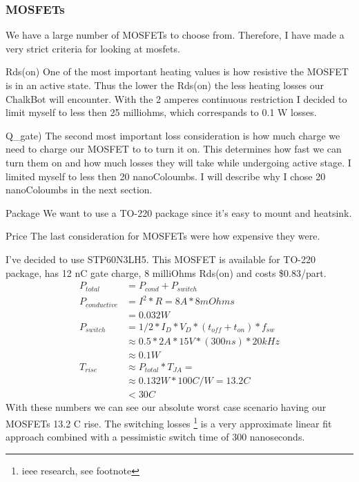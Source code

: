 \documentclass[12pt]{article}
\begin{document}
\subsubsection{MOSFETs}
We have a large number of MOSFETs to choose from. Therefore, I have made a very strict criteria for looking at mosfets.
\begin{description}
\item{Rds(on)} One of the most important heating values is how resistive the MOSFET is in an active state. Thus the lower the Rds(on) the less heating losses our ChalkBot will encounter. With the 2 amperes continuous restriction I decided to limit myself to less then 25 milliohms, which correspands to 0.1 W losses.
\item{Q\_gate)} The second most important loss consideration is how much charge we need to charge our MOSFET to to turn it on. This determines how fast we can turn them on and how much losses they will take while undergoing active stage. I limited myself to less then 20 nanoColoumbs. I will describe why I chose 20 nanoColoumbs in the next section.
\item{Package} We want to use a TO-220 package since it's easy to mount and heatsink. 
\item{Price} The last consideration for MOSFETs were how expensive they were.
\end{description}
I've decided to use STP60N3LH5. This MOSFET is available for TO-220 package, has 12 nC gate charge, 8 milliOhms Rds(on) and costs \$0.83/part. 
\begin{align}
P_{total} &= P_{cond} + P_{switch} \\
P_{conductive} &= I^{2} * R =  8 A * 8 mOhms 
\\ &= 0.032 W
\\ P_{switch} &= 1/2 * I_{D} * V_{D} * (t_{off} + t_{on}) * f_{sw} 
\\  &\approx 0.5 * 2A * 15 V * (300 ns) * 20 kHz
\\ &\approx 0.1 W
\\T_{rise}&\approx P_{total} * T_{JA} = 
\\ &\approx 0.132 W * 100 C/W = 13.2 C
\\ &<30C
\end{align}
With these numbers we can see our absolute worst case scenario having our MOSFETs 13.2 C rise. The switching losses \footnote{ieee research, see footnote} is a very approximate linear fit approach combined with a pessimistic switch time of 300 nanoseconds.
\end{document}
